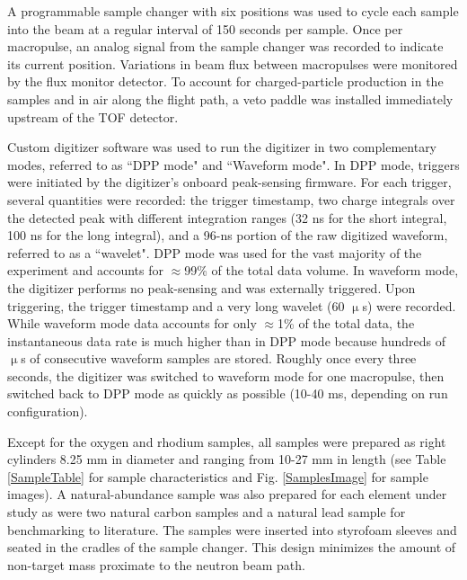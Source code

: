 \documentclass[twocolumn,secnumarabic,amssymb, nobibnotes, aps, prl,
superscriptaddress, nobalancelastpage]{revtex4}
\begin{document}
A programmable sample changer with six positions
was used to cycle each sample into the beam at a regular interval of 150 seconds 
per sample. Once per macropulse, an analog signal from the sample changer was recorded to 
indicate its current position. Variations in beam flux 
between macropulses were monitored by the flux monitor detector. To account for
charged-particle production in the samples and in air along the flight path, a
veto paddle was installed immediately upstream of the TOF detector.

Custom digitizer software was used to run the 
digitizer in two complementary modes, referred to as ``DPP mode" and ``Waveform 
mode". In DPP mode, triggers were initiated by the digitizer's onboard
peak-sensing firmware. For each trigger, several quantities were recorded: the trigger 
timestamp, two charge integrals over the detected peak with different
integration ranges (32 ns for the short integral, 100 ns for the long integral),
and a 96-ns portion of the raw digitized waveform, referred to as a ``wavelet".
DPP mode was used for the vast majority of the 
experiment and accounts for $\approx$99\% of the total data volume. In waveform mode, 
the digitizer performs no peak-sensing and was externally triggered. Upon 
triggering, the trigger timestamp and a very long wavelet (60 $\upmu$s) 
were recorded. While waveform mode data accounts for only $\approx$1\% of the total data, 
the instantaneous data rate is much higher than in DPP 
mode because hundreds of $\upmu$s of consecutive waveform samples are 
stored. Roughly once every three seconds, the digitizer was switched to 
waveform mode for one macropulse, then switched back to DPP mode as quickly as
possible (10-40 ms, depending on run configuration).  

Except for the oxygen and rhodium samples, all samples were prepared as right
cylinders 8.25 mm in diameter and ranging from 10-27 mm in length (see
Table \ref{SampleTable} for sample characteristics and Fig. \ref{SamplesImage}
for sample images). A natural-abundance sample
was also prepared for each element under study as were two natural carbon
samples and a natural lead sample for benchmarking to literature. The samples
were inserted into styrofoam sleeves and seated in the cradles of the sample
changer. This design minimizes the amount of non-target mass proximate to the
neutron beam path.
\end{document}
